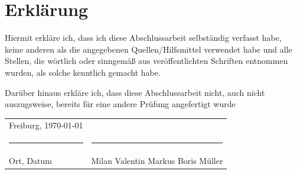 \begingroup
\setlength{\parindent}{0pt}

\section*{Erklärung}

\bigskip
\bigskip
\bigskip

Hiermit erkläre ich, dass ich diese Abschlussarbeit selbständig
verfasst habe, keine anderen
als die angegebenen Quellen/Hilfsmittel verwendet habe und alle
Stellen, die wörtlich oder
sinngemäß aus veröffentlichten Schriften entnommen wurden, als solche
kenntlich gemacht
habe.

Darüber hinaus erkläre ich, dass diese Abschlussarbeit nicht, auch nicht
auszugsweise, bereits für eine andere Prüfung angefertigt wurde

\bigskip
\bigskip
\bigskip
\bigskip
\bigskip
\bigskip

\begin{tabular}{p{} l}
  Freiburg, \today             &                              \\
  \rule{\textwidth*2/5}{0.4pt} & \rule{\textwidth*2/5}{0.4pt} \\
  Ort, Datum                   & Milan Valentin Markus Boris Müller
\end{tabular}

\endgroup
